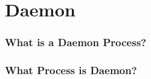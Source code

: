 \section{Daemon}

\begin{frame}
    \frametitle{What is a Daemon Process?}


\end{frame}

\begin{frame}
    \frametitle{What Process is Daemon?}



\end{frame}
